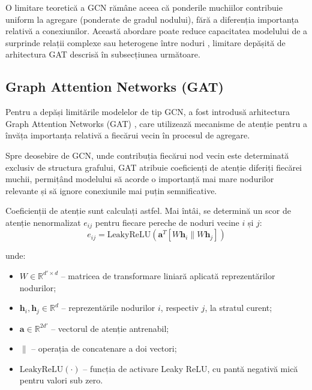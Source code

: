 \documentclass[12pt,a4paper]{report}
\theoremstyle{definition}
\theoremstyle{remark}
\begin{document}
O limitare teoretică a GCN rămâne aceea că ponderile muchiilor contribuie uniform la agregare (ponderate de gradul nodului), fără a diferenția importanța relativă a conexiunilor. Această abordare poate reduce capacitatea modelului de a surprinde relații complexe sau heterogene între noduri \cite{rahman2025advancement}, limitare depășită de arhitectura GAT descrisă în subsecțiunea următoare.


\subsection{Graph Attention Networks (GAT)}

Pentru a depăși limitările modelelor de tip GCN, a fost introdusă arhitectura Graph Attention Networks (GAT) \cite{veličković2018gat}, care utilizează mecanisme de atenție pentru a învăța importanța relativă a fiecărui vecin în procesul de agregare.

Spre deosebire de GCN, unde contribuția fiecărui nod vecin este determinată exclusiv de structura grafului, GAT atribuie coeficienți de atenție diferiți fiecărei muchii, permițând modelului să acorde o importanță mai mare nodurilor relevante și să ignore conexiunile mai puțin semnificative.

Coeficienții de atenție sunt calculați astfel. Mai întâi, se determină un scor de atenție nenormalizat $e_{ij}$ pentru fiecare pereche de noduri vecine $i$ și $j$:
\begin{equation}
    e_{ij} = \text{LeakyReLU}\left(\mathbf{a}^T \left[ W\mathbf{h}_i \| W\mathbf{h}_j \right]\right)
    \label{eq:gat_attention}
\end{equation}

\noindent unde:
\begin{itemize}
    \item $W \in \mathbb{R}^{d' \times d}$ -- matricea de transformare liniară aplicată reprezentărilor nodurilor;
    \item $\mathbf{h}_i, \mathbf{h}_j \in \mathbb{R}^d$ -- reprezentările nodurilor $i$, respectiv $j$, la stratul curent;
    \item $\mathbf{a} \in \mathbb{R}^{2d'}$ -- vectorul de atenție antrenabil;
    \item $\|$ -- operația de concatenare a doi vectori;
    \item $\text{LeakyReLU}(\cdot)$ -- funcția de activare Leaky ReLU, cu pantă negativă mică pentru valori sub zero.
\end{itemize}
\end{document}

